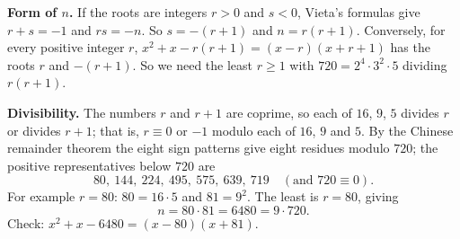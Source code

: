 \textbf{Form of $n$.} If the roots are integers $r>0$ and $s<0$, Vieta's formulas give $r+s=-1$ and $rs=-n$. So $s=-(r+1)$ and $n=r(r+1)$. Conversely, for every positive integer $r$, $x^2+x-r(r+1)=(x-r)(x+r+1)$ has the roots $r$ and $-(r+1)$. So we need the least $r\ge1$ with $720=2^4\cdot3^2\cdot5$ dividing $r(r+1)$.

\textbf{Divisibility.} The numbers $r$ and $r+1$ are coprime, so each of $16$, $9$, $5$ divides $r$ or divides $r+1$; that is, $r\equiv0$ or $-1$ modulo each of $16$, $9$ and $5$. By the Chinese remainder theorem the eight sign patterns give eight residues modulo $720$; the positive representatives below $720$ are
\[
80,\ 144,\ 224,\ 495,\ 575,\ 639,\ 719 \quad(\text{and } 720\equiv0).
\]
For example $r=80$: $80=16\cdot5$ and $81=9^2$. The least is $r=80$, giving
\[
n=80\cdot81=\boxed{6480}=9\cdot720 .
\]
Check: $x^2+x-6480=(x-80)(x+81)$.
